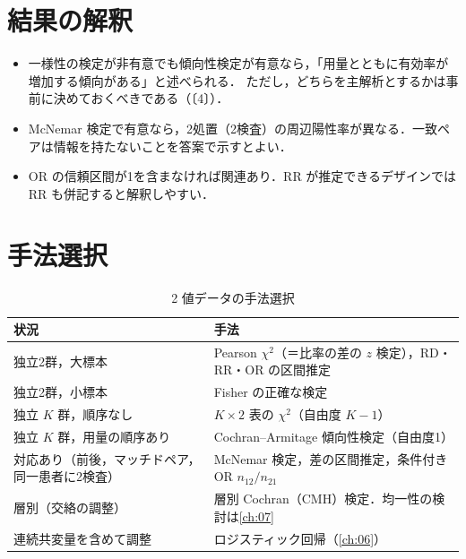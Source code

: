 \section{結果の解釈}\label{sec:04-interp}
\begin{itemize}
\item 一様性の検定が非有意でも傾向性検定が有意なら，「用量とともに有効率が増加する傾向がある」と述べられる．
      ただし，どちらを主解析とするかは事前に決めておくべきである（〔4〕）．
\item McNemar 検定で有意なら，2処置（2検査）の周辺陽性率が異なる．一致ペアは情報を持たないことを答案で示すとよい．
\item OR の信頼区間が1を含まなければ関連あり．RR が推定できるデザインでは RR も併記すると解釈しやすい．
\end{itemize}

\section{手法選択}\label{sec:04-choice}
\begin{table}[htbp]
\centering\small
\caption{2 値データの手法選択}\label{tab:04-choice}
\begin{tabular}{@{}L{55mm}L{85mm}@{}}
\toprule
状況 & 手法\\
\midrule
独立2群，大標本 & Pearson $\chi^2$（＝比率の差の $z$ 検定），RD・RR・OR の区間推定\\
独立2群，小標本 & Fisher の正確な検定\\
独立 $K$ 群，順序なし & $K\times2$ 表の $\chi^2$（自由度 $K-1$）\\
独立 $K$ 群，用量の順序あり & Cochran--Armitage 傾向性検定（自由度1）\\
対応あり（前後，マッチドペア，同一患者に2検査） & McNemar 検定，差の区間推定，条件付きOR $n_{12}/n_{21}$\\
層別（交絡の調整） & 層別 Cochran（CMH）検定．均一性の検討は\cref{ch:07}\\
連続共変量を含めて調整 & ロジスティック回帰（\cref{ch:06}）\\
\bottomrule
\end{tabular}
\end{table}

